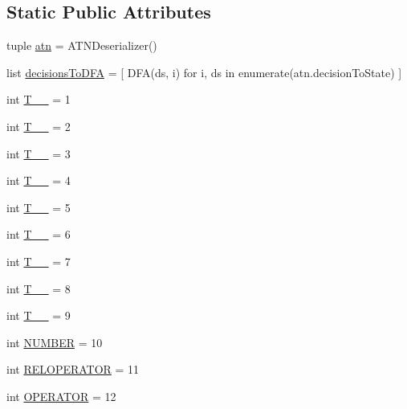 \subsection*{Static Public Attributes}
\begin{DoxyCompactItemize}
\item 
tuple \hyperlink{class_prolog_rules_lexer_1_1_prolog_rules_lexer_a938947ed2aec1cfc09c094ce44bd832b}{atn} = A\+T\+N\+Deserializer()
\item 
list \hyperlink{class_prolog_rules_lexer_1_1_prolog_rules_lexer_aa54e09333e7fafa3cde349fa87406924}{decisions\+To\+D\+F\+A} = \mbox{[} D\+F\+A(ds, i) for i, ds in enumerate(atn.\+decision\+To\+State) \mbox{]}
\item 
int \hyperlink{class_prolog_rules_lexer_1_1_prolog_rules_lexer_a6325b4258e81c531ac7cd5e46c0fde86}{T\+\_\+\+\_} = 1
\item 
int \hyperlink{class_prolog_rules_lexer_1_1_prolog_rules_lexer_a048b46715d9de3b9cb895602680ef8ba}{T\+\_\+\+\_} = 2
\item 
int \hyperlink{class_prolog_rules_lexer_1_1_prolog_rules_lexer_a7918ad929c34481ba9c1fccf0dc2049b}{T\+\_\+\+\_} = 3
\item 
int \hyperlink{class_prolog_rules_lexer_1_1_prolog_rules_lexer_a0651d9aa3905f40e3e4efe27a2d0da3b}{T\+\_\+\+\_} = 4
\item 
int \hyperlink{class_prolog_rules_lexer_1_1_prolog_rules_lexer_af2e6d8f610c091ed1237a1036fa27cf5}{T\+\_\+\+\_} = 5
\item 
int \hyperlink{class_prolog_rules_lexer_1_1_prolog_rules_lexer_a30d769d7e6e0d33ce068265a838e5652}{T\+\_\+\+\_} = 6
\item 
int \hyperlink{class_prolog_rules_lexer_1_1_prolog_rules_lexer_a8a043ea7c358f584213d18fcbc020d7f}{T\+\_\+\+\_} = 7
\item 
int \hyperlink{class_prolog_rules_lexer_1_1_prolog_rules_lexer_a1d28a6546ce8a66389e42a9768b7b88b}{T\+\_\+\+\_} = 8
\item 
int \hyperlink{class_prolog_rules_lexer_1_1_prolog_rules_lexer_a72a26fe003fdf57c9955238bbb237304}{T\+\_\+\+\_} = 9
\item 
int \hyperlink{class_prolog_rules_lexer_1_1_prolog_rules_lexer_a091be41b1881614a1c583f2a5948e5b4}{N\+U\+M\+B\+E\+R} = 10
\item 
int \hyperlink{class_prolog_rules_lexer_1_1_prolog_rules_lexer_acf0cf5342114237d04f9409fab63887f}{R\+E\+L\+O\+P\+E\+R\+A\+T\+O\+R} = 11
\item 
int \hyperlink{class_prolog_rules_lexer_1_1_prolog_rules_lexer_a2a8ca9d1479d198d15fec094826e97fa}{O\+P\+E\+R\+A\+T\+O\+R} = 12

\end{DoxyCompactItemize}
